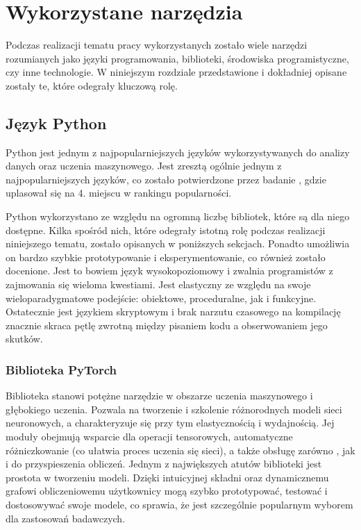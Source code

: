 \chapter{Wykorzystane narzędzia}
Podczas realizacji tematu pracy wykorzystanych zostało wiele narzędzi rozumianych jako języki programowania, biblioteki, środowiska programistyczne, czy inne technologie. W niniejszym rozdziale przedstawione i dokładniej opisane zostały te, które odegrały kluczową rolę.

\section{Język Python}
Python jest jednym z najpopularniejszych języków wykorzystywanych do analizy danych oraz uczenia maszynowego. Jest zresztą ogólnie jednym z najpopularniejszych języków, co zostało potwierdzone przez badanie  , gdzie uplasował się na 4. miejscu w rankingu popularności.

Python wykorzystano ze względu na ogromną liczbę bibliotek, które są dla niego dostępne. Kilka spośród nich, które odegrały istotną rolę podczas realizacji niniejszego tematu, zostało opisanych w poniższych sekcjach. Ponadto umożliwia on bardzo szybkie prototypowanie i eksperymentowanie, co również zostało docenione. Jest to bowiem język wysokopoziomowy i zwalnia programistów z zajmowania się wieloma kwestiami. Jest elastyczny ze względu na swoje wieloparadygmatowe podejście: obiektowe, proceduralne, jak i funkcyjne. Ostatecznie jest językiem skryptowym i brak narzutu czasowego na kompilację znacznie skraca pętlę zwrotną między pisaniem kodu a obserwowaniem jego skutków.

\subsection{Biblioteka PyTorch}
Biblioteka  stanowi potężne narzędzie w obszarze uczenia maszynowego i głębokiego uczenia. Pozwala na tworzenie i szkolenie różnorodnych modeli sieci neuronowych, a charakteryzuje się przy tym elastycznością i wydajnością.  Jej moduły obejmują wsparcie dla operacji tensorowych, automatyczne różniczkowanie (co ułatwia proces uczenia się sieci), a także obsługę zarówno , jak i  do przyspieszenia obliczeń. Jednym z największych atutów biblioteki  jest prostota w tworzeniu modeli. Dzięki intuicyjnej składni oraz dynamicznemu grafowi obliczeniowemu użytkownicy mogą szybko prototypować, testować i dostosowywać swoje modele, co sprawia, że jest szczególnie popularnym wyborem dla zastosowań badawczych.

